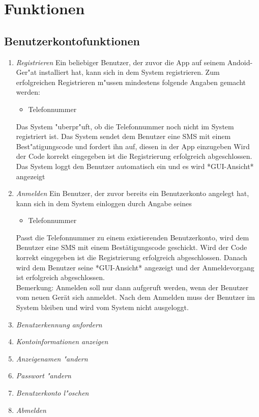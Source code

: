 \documentclass[parskip=full]{scrartcl}
\def\threedigits#1{%
  \ifnum#1<100 0\fi
  \ifnum#1<10 0\fi
  \number#1}
\begin{document}
\section{Funktionen}

\subsection{Benutzerkontofunktionen}

\begin{enumerate}[label={\textbf{/F\protect\threedigits{\theenumi}0/}}, leftmargin=*]
	
	
	\item \textit{Registrieren} Ein beliebiger Benutzer, der zuvor die App auf seinem Andoid-Ger"at installiert hat, kann sich in dem System registrieren. Zum erfolgreichen Registrieren m"ussen mindestens folgende Angaben gemacht werden:
	\begin{itemize}
		\item Telefonnummer %
	\end{itemize}
	 Das System "uberpr"uft, ob die Telefonnummer noch nicht im System registriert ist. Das System sendet dem Benutzer eine SMS %
	 mit einem Best"atigungscode und fordert ihn auf, diesen in der App einzugeben %
	 Wird der Code korrekt eingegeben ist die Registrierung erfolgreich abgeschlossen. Das System loggt den Benutzer automatisch ein und es wird *GUI-Ansicht* angezeigt %
	
	
	\item \textit{Anmelden} Ein Benutzer, der zuvor bereits ein Benutzerkonto angelegt hat, kann sich in dem System einloggen durch Angabe seines
	\begin{itemize}
		\item Telefonnummer
	\end{itemize}
	Passt die Telefonnummer zu einem existierenden Benutzerkonto, wird dem Benutzer eine SMS mit einem Bestätigungscode geschickt. Wird der Code korrekt eingegeben ist die Registrierung erfolgreich abgeschlossen. Danach wird dem Benutzer seine *GUI-Ansicht* angezeigt und der Anmeldevorgang ist erfolgreich abgeschlossen.\\
Bemerkung: Anmelden soll nur dann aufgeruft werden, wenn der Benutzer vom neuen Gerät sich anmeldet. Nach dem Anmelden muss der Benutzer im System bleiben und wird vom System nicht ausgeloggt.
	
	\item \textit{Benutzerkennung anfordern}
	\item \textit{Kontoinformationen anzeigen}
	\item \textit{Anzeigenamen "andern}
	\item \textit{Passwort "andern}
	\item \textit{Benutzerkonto l"oschen}
	\item \textit{Abmelden}
\end{enumerate}
\end{document}
